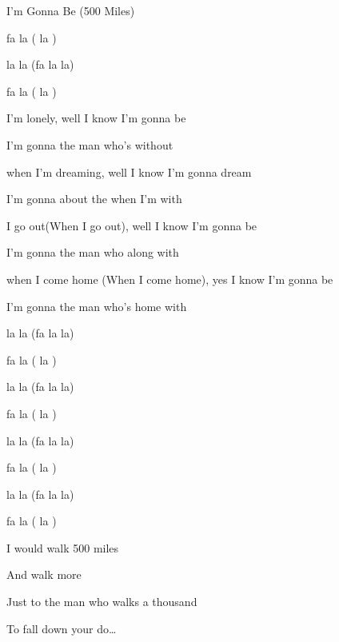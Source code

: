 \begin{SBSong}{I'm Gonna Be (500 Miles)}
\begin{SBChorus*}
	fa  la ( la )

	 la la (fa la la)
	
	fa  la ( la )
  \end{SBChorus*}
  \begin{SBVerse}
     I'm lonely, well I know I'm gonna be

	I'm gonna  the man who's  without 

     when I'm dreaming, well I know I'm gonna dream

	I'm gonna  about the  when I'm with 

     I go out(When I go out), well I know I'm gonna be

	I'm gonna  the man who  along with 

     when I come home (When I come home), yes I know I'm gonna be

	I'm gonna  the man who's  home with 
  \end{SBVerse}
  \begin{SBChorus*}
	 la la (fa la la)
	
	fa  la ( la )

	 la la (fa la la)
	
	fa  la ( la )

	 la la (fa la la)
	
	fa  la ( la )

	 la la (fa la la)
	
	fa  la ( la )
  \end{SBChorus*}
  \begin{SBChorus}
     I would walk 500 miles

	And  walk  more

	Just to  the man who walks a thousand 

	To fall down  your do\ldots{}
  \end{SBChorus}
 \end{SBSong}
